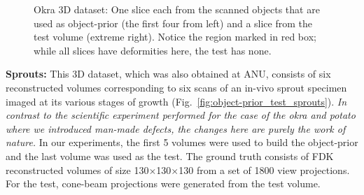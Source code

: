 \documentclass[journal]{IEEEtran}
\begin{document}
\begin{figure}[!h]
\begin{subfigure}[b]{0.148\linewidth}
\captionsetup{labelformat=empty}
        \caption{}
    \end{subfigure}
     \caption{Okra 3D dataset: One slice each from the scanned objects that are used as object-prior (the first four from left) and a slice from the test 
        volume (extreme right). Notice the region marked in red box; while all slices have deformities here, the test has none.}
\label{fig:object-prior_test_okra}
\end{figure}

\textbf{Sprouts:} This 3D dataset, which was also obtained at ANU,
consists of six reconstructed volumes corresponding to six scans of an
in-vivo sprout specimen imaged at its various stages of growth
(Fig.~\ref{fig:object-prior_test_sprouts}).  \textit{In contrast to
  the scientific experiment performed for the case of the okra and
  potato where we introduced man-made defects, the changes here are
  purely the work of nature.} In our experiments, the first 5 volumes
were used to build the object-prior and the last volume was used as
the test. The ground truth consists of FDK reconstructed volumes of
size 130$\times$130$\times$130 from a set of 1800 view
projections. For the test, cone-beam projections were generated from
the test volume. \\
\end{document}
